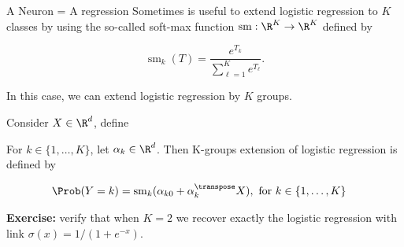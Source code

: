\documentclass[9pt,xcolor=table]{beamer}
\newcommand{\sm}{\operatorname{sm}}
\begin{document}
\begin{frame}{A Neuron = A regression}
Sometimes is useful to extend logistic regression to $K$ classes by using the so-called soft-max function $\sm:\R^K \to \R^K$ defined by

$$\sm_k(T) = \frac{e^{T_k}}{\sum_{\ell=1}^K e^{T_\ell}}.$$

In this case, we can extend logistic regression by $K$ groups.

{
	Consider $X \in \R^d$, define 
	
	 For $k \in \{1,\ldots, K\}$, let $\alpha_k \in \R^d$. Then K-groups extension of logistic regression is defined by
	 
	 \begin{align*}
	 \Prob(Y=k) &= \sm_k(\alpha_{k0} + \alpha_k^{\transpose} X),  \text{ for $k \in \{1,\ldots, K\}$}
	 \end{align*}
	 
}
\textbf{Exercise:} verify that when $K=2$ we recover exactly the logistic regression with link $\sigma(x) = 1/(1+e^{-x})$.
\end{frame}
\end{document}
